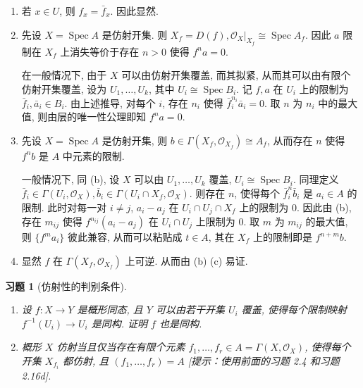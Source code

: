 \documentclass{article}
\theoremstyle{exercise}
\newtheorem{exercise}{习题}[section]
\newenvironment{proofc}{\proof}{\endproof}
\def\cO{\mathscr{O}}
\def\Spec{\operatorname{Spec}}
\begin{document}
\begin{proofc}
  \begin{enumerate}[label={(\alph*)}]
    \item 若 $x \in U$, 则 $f_x = \bar{f}_x$. 因此显然.
    \item 先设 $X = \Spec A$ 是仿射开集. 则 $X_f = D(f), \cO_X|_{X_f} \cong \Spec A_f$.
          因此 $a$ 限制在 $X_f$ 上消失等价于存在 $n > 0$ 使得 $f^n a = 0$.

          在一般情况下, 由于 $X$ 可以由仿射开集覆盖, 而其拟紧, 从而其可以由有限个仿射开集覆盖,
          设为 $U_1, \dots, U_k$, 其中 $U_i \cong \Spec B_i$.
          记 $f, a$ 在 $U_i$ 上的限制为 $\bar{f}_i, \bar{a}_i \in B_i$.
          由上述推导, 对每个 $i$, 存在 $n_i$ 使得 $\bar{f}_i^{n_i} \bar{a}_i = 0$.
          取 $n$ 为 $n_i$ 中的最大值, 则由层的唯一性公理即知 $f^n a = 0$.
    \item 先设 $X = \Spec A$ 是仿射开集, 则 $b \in \Gamma(X_f, \cO_{X_f}) \cong A_f$,
          从而存在 $n$ 使得 $f^n b$ 是 $A$ 中元素的限制.

          一般情况下, 同 (b), 设 $X$ 可以由 $U_1, \dots, U_k$ 覆盖, $U_i \cong \Spec B_i$.
          同理定义 $\bar{f}_i \in \Gamma(U_i, \cO_X), \bar{b}_i \in \Gamma(U_i \cap X_f, \cO_X)$.
          则存在 $n$, 使得每个 $\bar{f}_i^n \bar{b}_i$ 是 $a_i \in A$ 的限制.
          此时对每一对 $i \neq j$, $a_i - a_j$ 在 $U_i \cap U_j \cap X_f$ 上的限制为 $0$.
          因此由 (b), 存在 $m_{ij}$ 使得 $f^{n_{ij}} (a_i - a_j)$ 在 $U_i \cap U_j$ 上限制为 $0$.
          取 $m$ 为 $m_{ij}$ 的最大值, 则 $\{ f^m a_i \}$ 彼此兼容,
          从而可以粘贴成 $t \in A$, 其在 $X_f$ 上的限制即是 $f^{n + m} b$.
    \item 显然 $f$ 在 $\Gamma(X_f, \cO_{X_f})$ 上可逆. 从而由 (b) (c) 易证.
          \qedhere
  \end{enumerate}
\end{proofc}

\begin{exercise}[仿射性的判别条件]
  \begin{enumerate}[label={(\alph*)}]
    \item 设 $f \colon X \to Y$ 是概形同态, 且 $Y$ 可以由若干开集 $U_i$ 覆盖,
          使得每个限制映射 $f^{-1}(U_i) \to U_i$ 是同构. 证明 $f$ 也是同构.
    \item 概形 $X$ 仿射当且仅当存在有限个元素 $f_1, \dots, f_r \in A = \Gamma(X, \cO_X)$,
          使得每个开集 $X_{f_i}$ 都仿射, 且 $(f_1, \dots, f_r) = A$
          [提示：使用前面的习题 2.4 和习题 2.16d].
  \end{enumerate}
\end{exercise}
\end{document}
